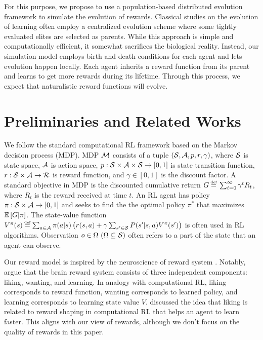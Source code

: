 For this purpose, we propose to use a population-based distributed evolution framework to simulate the evolution of rewards. Classical studies on the evolution of learning \citep{hintonHowLearningCan1987,singhWhereRewardsCome2009} often employ a centralized evolution scheme where some tightly evaluated elites are selected as parents. While this approach is simple and computationally efficient, it somewhat sacrifices the biological reality. Instead, our simulation model employs birth and death conditions for each agent and lets evolution happen locally. Each agent inherits a reward function from its parent and learns to get more rewards during its lifetime. Through this process, we expect that naturalistic reward functions will evolve.

\section{Preliminaries and Related Works}\label{sec:related}
We follow the standard computational RL framework \citep{suttonReinforcementLearningIntroduction2018} based on the Markov decision process (MDP). MDP $\mathcal{M}{}$ consists of a tuple $(\mathcal{S}{}, \mathcal{A}{}, p, r, \gamma)$, where $\mathcal{S}{}$ is state space, $\mathcal{A}{}$ is action space, $p: \mathcal{S}\times\mathcal{A}\times \mathcal{S} \rightarrow [0, 1]$ is state transition function, $r: \mathcal{S}\times\mathcal{A} \rightarrow \mathcal{R}$ is reward function, and $\gamma \in [0, 1]$ is the discount factor. A standard objective in MDP is the discounted cumulative return $G \defequal{} \sum_{t=0}^{\infty}\gamma^t R_{t}$, where $R_t$ is the reward received at time $t$. An RL agent has policy $\pi: \mathcal{S} \times \mathcal{A} \rightarrow [0, 1]$ and seeks to find the the optimal policy $\pi^{*}$ that maximizes $\mathbb{E} \left[G|\pi\right]$. The state-value function $V^\pi(s) \defequal \sum_{a \in \A} \pi(a|s) \left( r(s, a) + \gamma \sum_{s' \in \X} P(s'|s, a) V^\pi(s') \right)$ is often used in RL algorithms. Observation $o \in \Omega~(\Omega \subseteq \mathcal{S})$ often refers to a part of the state that an agent can observe.

Our reward model is inspired by the neuroscience of reward system \citep{schultzNeuronalRewardDecision2015, berridgePleasureSystemsBrain2015}. Notably, \citet{berridgeDissectingComponentsReward2009} argue that the brain reward system consists of three independent components: liking, wanting, and learning. In analogy with computational RL, liking corresponds to reward function, wanting corresponds to learned policy, and learning corresponds to learning state value $V$. \citet{dayanLikingEarlyEditable2022} discussed the idea that liking is related to reward shaping \citep{ngPolicyInvarianceReward1999} in computational RL that helps an agent to learn faster. This aligns with our view of rewards, although we don't focus on the quality of rewards in this paper.

